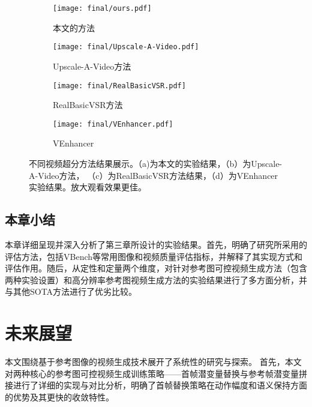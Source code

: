 \begin{figure}[H]
    \centering
    \begin{subfigure}[b]{0.9\textwidth}
        \texttt{[image: final/ours.pdf]}
        \caption{本文的方法}
        \label{fig:ours}
    \end{subfigure}

    \vspace{0.5em} %

    \begin{subfigure}[b]{0.3\textwidth}
        \texttt{[image: final/Upscale-A-Video.pdf]}
        \caption{Upscale-A-Video方法}
        \label{fig:upscale}
    \end{subfigure}
    \hfill
    \begin{subfigure}[b]{0.3\textwidth}
        \texttt{[image: final/RealBasicVSR.pdf]}
        \caption{RealBasicVSR方法}
        \label{fig:rbvsr}
    \end{subfigure}
    \hfill
    \begin{subfigure}[b]{0.3\textwidth}
        \texttt{[image: final/VEnhancer.pdf]}
        \caption{VEnhancer}
        \label{fig:venhancer方法}
    \end{subfigure}

    \caption{不同视频超分方法结果展示。（a)为本文的实验结果，（b）为Upscale-A-Video方法， （c）为RealBasicVSR方法结果，（d）为VEnhancer实验结果。放大观看效果更佳。}
    \label{fig:vsrcompare}
\end{figure}



\subsection{本章小结}
本章详细呈现并深入分析了第三章所设计的实验结果。首先，明确了研究所采用的评估方法，包括VBench等常用图像和视频质量评估指标，并解释了其实现方式和评估作用。随后，从定性和定量两个维度，对针对参考图可控视频生成方法（包含两种实验设置）和高分辨率参考图视频生成方法的实验结果进行了多方面分析，并与其他SOTA方法进行了优劣比较。

\cleardoublepage

\section{未来展望}
本文围绕基于参考图像的视频生成技术展开了系统性的研究与探索。
首先，本文对两种核心的参考图可控视频生成训练策略——首帧潜变量替换与参考帧潜变量拼接进行了详细的实现与对比分析，明确了首帧替换策略在动作幅度和语义保持方面的优势及其更快的收敛特性。

